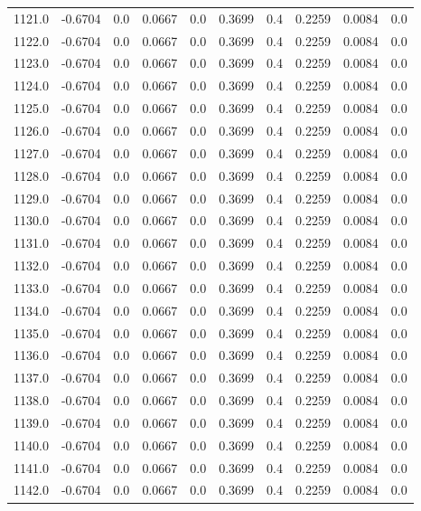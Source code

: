 \begin{longtable}{lrrrrrrrrr}
1121.0 & -0.6704 & 0.0 & 0.0667 & 0.0 & 0.3699 & 0.4 & 0.2259 & 0.0084 & 0.0 \\
1122.0 & -0.6704 & 0.0 & 0.0667 & 0.0 & 0.3699 & 0.4 & 0.2259 & 0.0084 & 0.0 \\
1123.0 & -0.6704 & 0.0 & 0.0667 & 0.0 & 0.3699 & 0.4 & 0.2259 & 0.0084 & 0.0 \\
1124.0 & -0.6704 & 0.0 & 0.0667 & 0.0 & 0.3699 & 0.4 & 0.2259 & 0.0084 & 0.0 \\
1125.0 & -0.6704 & 0.0 & 0.0667 & 0.0 & 0.3699 & 0.4 & 0.2259 & 0.0084 & 0.0 \\
1126.0 & -0.6704 & 0.0 & 0.0667 & 0.0 & 0.3699 & 0.4 & 0.2259 & 0.0084 & 0.0 \\
1127.0 & -0.6704 & 0.0 & 0.0667 & 0.0 & 0.3699 & 0.4 & 0.2259 & 0.0084 & 0.0 \\
1128.0 & -0.6704 & 0.0 & 0.0667 & 0.0 & 0.3699 & 0.4 & 0.2259 & 0.0084 & 0.0 \\
1129.0 & -0.6704 & 0.0 & 0.0667 & 0.0 & 0.3699 & 0.4 & 0.2259 & 0.0084 & 0.0 \\
1130.0 & -0.6704 & 0.0 & 0.0667 & 0.0 & 0.3699 & 0.4 & 0.2259 & 0.0084 & 0.0 \\
1131.0 & -0.6704 & 0.0 & 0.0667 & 0.0 & 0.3699 & 0.4 & 0.2259 & 0.0084 & 0.0 \\
1132.0 & -0.6704 & 0.0 & 0.0667 & 0.0 & 0.3699 & 0.4 & 0.2259 & 0.0084 & 0.0 \\
1133.0 & -0.6704 & 0.0 & 0.0667 & 0.0 & 0.3699 & 0.4 & 0.2259 & 0.0084 & 0.0 \\
1134.0 & -0.6704 & 0.0 & 0.0667 & 0.0 & 0.3699 & 0.4 & 0.2259 & 0.0084 & 0.0 \\
1135.0 & -0.6704 & 0.0 & 0.0667 & 0.0 & 0.3699 & 0.4 & 0.2259 & 0.0084 & 0.0 \\
1136.0 & -0.6704 & 0.0 & 0.0667 & 0.0 & 0.3699 & 0.4 & 0.2259 & 0.0084 & 0.0 \\
1137.0 & -0.6704 & 0.0 & 0.0667 & 0.0 & 0.3699 & 0.4 & 0.2259 & 0.0084 & 0.0 \\
1138.0 & -0.6704 & 0.0 & 0.0667 & 0.0 & 0.3699 & 0.4 & 0.2259 & 0.0084 & 0.0 \\
1139.0 & -0.6704 & 0.0 & 0.0667 & 0.0 & 0.3699 & 0.4 & 0.2259 & 0.0084 & 0.0 \\
1140.0 & -0.6704 & 0.0 & 0.0667 & 0.0 & 0.3699 & 0.4 & 0.2259 & 0.0084 & 0.0 \\
1141.0 & -0.6704 & 0.0 & 0.0667 & 0.0 & 0.3699 & 0.4 & 0.2259 & 0.0084 & 0.0 \\
1142.0 & -0.6704 & 0.0 & 0.0667 & 0.0 & 0.3699 & 0.4 & 0.2259 & 0.0084 & 0.0 \\

\end{longtable}
